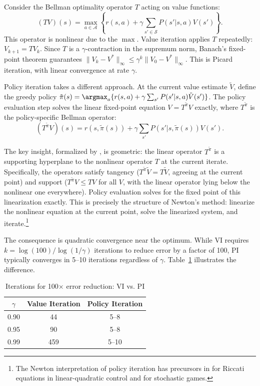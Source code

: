 Consider the Bellman optimality operator $T$ acting on value functions:
\begin{equation}
(TV)(s) = \max_{a \in \mathcal{A}} \left\{ r(s,a) + \gamma \sum_{s' \in \mathcal{S}} P(s'|s,a) V(s') \right\}.
\label{eq:bellman_operator}
\end{equation}
This operator is nonlinear due to the $\max$. Value iteration applies $T$ repeatedly: $V_{k+1} = TV_k$. Since $T$ is a $\gamma$-contraction in the supremum norm, Banach's fixed-point theorem guarantees $\|V_k - V^*\|_\infty \leq \gamma^k \|V_0 - V^*\|_\infty$. This is Picard iteration, with linear convergence at rate $\gamma$.

Policy iteration takes a different approach. At the current value estimate $\tilde{V}$, define the greedy policy $\tilde{\pi}(s) = \argmax_a \{ r(s,a) + \gamma \sum_{s'} P(s'|s,a) \tilde{V}(s') \}$. The policy evaluation step solves the linear fixed-point equation $V = T^{\tilde{\pi}} V$ exactly, where $T^{\tilde{\pi}}$ is the policy-specific Bellman operator:
\begin{equation}
(T^{\tilde{\pi}} V)(s) = r(s, \tilde{\pi}(s)) + \gamma \sum_{s'} P(s'|s,\tilde{\pi}(s)) V(s').
\end{equation}

The key insight, formalized by \citet{puterman1979}, is geometric: the linear operator $T^{\tilde{\pi}}$ is a supporting hyperplane to the nonlinear operator $T$ at the current iterate. Specifically, the operators satisfy tangency ($T^{\tilde{\pi}} \tilde{V} = T\tilde{V}$, agreeing at the current point) and support ($T^{\tilde{\pi}} V \leq TV$ for all $V$, with the linear operator lying below the nonlinear one everywhere). Policy evaluation solves for the fixed point of this linearization exactly. This is precisely the structure of Newton's method: linearize the nonlinear equation at the current point, solve the linearized system, and iterate.\footnote{The Newton interpretation of policy iteration has precursors in \citet{kleinman1968} for Riccati equations in linear-quadratic control and \citet{pollatschek1969} for stochastic games.}

The consequence is quadratic convergence near the optimum. While VI requires $k = \log(100) / \log(1/\gamma)$ iterations to reduce error by a factor of 100, PI typically converges in 5--10 iterations regardless of $\gamma$. Table~\ref{tab:vi_pi_comparison} illustrates the difference.

\begin{table}[h!]
\centering
\caption{Iterations for 100$\times$ error reduction: VI vs. PI}
\label{tab:vi_pi_comparison}
\small
\begin{tabular}{c|cc}
\hline
$\gamma$ & Value Iteration & Policy Iteration \\
\hline
0.90 & 44 & 5--8 \\
0.95 & 90 & 5--8 \\
0.99 & 459 & 5--10 \\
\hline
\end{tabular}
\end{table}

